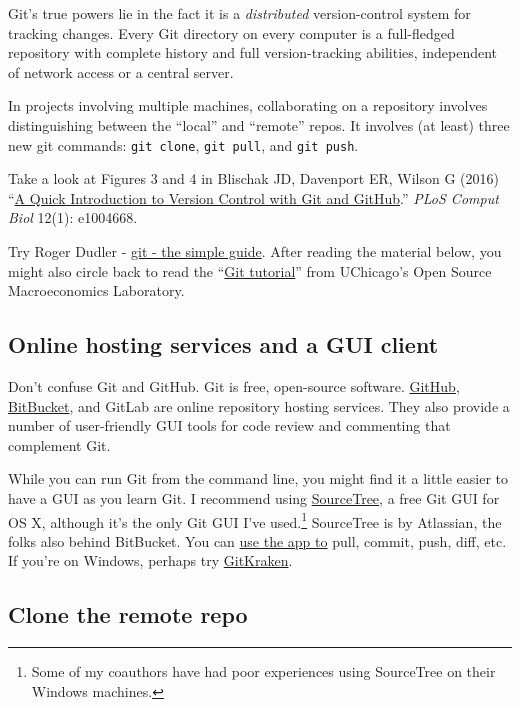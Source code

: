 
Git's true powers lie in the fact it is a \textit{distributed} version-control system for tracking changes.
Every Git directory on every computer is a full-fledged repository with complete history and full version-tracking abilities, independent of network access or a central server.

In projects involving multiple machines,
collaborating on a repository involves distinguishing between the ``local'' and ``remote'' repos.
It involves (at least) three new git commands: \texttt{git clone}, \texttt{git pull}, and \texttt{git push}.

Take a look at Figures 3 and 4 in
Blischak JD, Davenport ER, Wilson G (2016) 
``\href{http://journals.plos.org/ploscompbiol/article?id=10.1371/journal.pcbi.1004668}{A Quick Introduction to Version Control with Git and GitHub}.'' \textit{PLoS Comput Biol} 12(1): e1004668.

Try Roger Dudler - \href{http://rogerdudler.github.io/git-guide/}{git - the simple guide}.
After reading the material below, you might also circle back to read
the ``\href{https://github.com/OpenSourceMacro/BootCamp2017/blob/master/Tutorials/git_tutorial.pdf}{Git tutorial}''
from UChicago's Open Source Macroeconomics Laboratory.

\subsection{Online hosting services and a GUI client}

Don't confuse Git and GitHub.
Git is free, open-source software.
\href{http://www.github.com}{GitHub}, \href{https://bitbucket.org/}{BitBucket}, and GitLab are
online repository hosting services.
They also provide a number of user-friendly GUI tools for code review and commenting that complement Git.

While you can run Git from the command line,
you might find it a little easier to have a GUI as you learn Git.
I recommend using \href{https://www.sourcetreeapp.com/}{SourceTree},
a free Git GUI for OS X, although it's the only Git GUI I've used.\footnote{
	Some of my coauthors have had poor experiences using SourceTree on their Windows machines.
}
SourceTree is by Atlassian, the folks also behind BitBucket.
You can \href{https://confluence.atlassian.com/get-started-with-sourcetree/work-using-git-847359053.html}{use the app to} pull, commit, push, diff, etc.
If you're on Windows, perhaps try \href{https://www.gitkraken.com/}{GitKraken}.

\subsection{Clone the remote repo}

